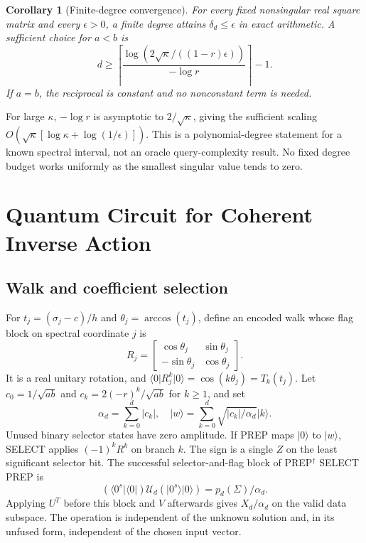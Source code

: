 \documentclass[journal]{IEEEtran}
\newtheorem{corollary}{Corollary}
\newcommand{\ket}[1]{\lvert#1\rangle}
\newcommand{\bra}[1]{\langle#1\rvert}
\begin{document}
\begin{corollary}[Finite-degree convergence]
For every fixed nonsingular real square matrix and every $\epsilon>0$, a
finite degree attains $\delta_d\leq\epsilon$ in exact arithmetic. A sufficient
choice for $a<b$ is
\begin{equation}
 d\geq
 \left\lceil\frac{\log(2\sqrt\kappa/((1-r)\epsilon))}{-\log r}\right\rceil-1.
 \label{eq:degree}
\end{equation}
If $a=b$, the reciprocal is constant and no nonconstant term is needed.
\end{corollary}
For large $\kappa$, $-\log r$ is asymptotic to $2/\sqrt\kappa$, giving the
sufficient scaling $O(\sqrt\kappa[\log\kappa+\log(1/\epsilon)])$. This is a
polynomial-degree statement for a known spectral interval, not an oracle
query-complexity result. No fixed degree budget works uniformly as the
smallest singular value tends to zero.

\section{Quantum Circuit for Coherent Inverse Action}
\label{sec:quantumcircuit}
\subsection{Walk and coefficient selection}
For $t_j=(\sigma_j-c)/h$ and $\theta_j=\arccos(t_j)$, define an encoded walk
whose flag block on spectral coordinate $j$ is
\begin{equation}
 R_j=\begin{bmatrix}
 \cos\theta_j&\sin\theta_j\\-\sin\theta_j&\cos\theta_j
 \end{bmatrix}.
 \label{eq:walk}
\end{equation}
It is a real unitary rotation, and
$\bra0R_j^k\ket0=\cos(k\theta_j)=T_k(t_j)$.
Let $c_0=1/\sqrt{ab}$ and $c_k=2(-r)^k/\sqrt{ab}$ for $k\geq1$, and set
\begin{equation}
 \alpha_d=\sum_{k=0}^d|c_k|,
 \quad \ket w=\sum_{k=0}^d\sqrt{|c_k|/\alpha_d}\ket k.
 \label{eq:lcuweights}
\end{equation}
Unused binary selector states have zero amplitude. If PREP maps $\ket0$ to
$\ket w$, SELECT applies $(-1)^kR^k$ on branch $k$. The sign is a single $Z$
on the least significant selector bit. The successful selector-and-flag block
of PREP$^\dagger$ SELECT PREP is
\begin{equation}
 (\bra{0^s}\bra0)\mathcal U_d(\ket{0^s}\ket0)
 =p_d(\Sigma)/\alpha_d.
 \label{eq:block}
\end{equation}
Applying $U^T$ before this block and $V$ afterwards gives $X_d/\alpha_d$ on
the valid data subspace. The operation is independent of the unknown solution
and, in its unfused form, independent of the chosen input vector.
\end{document}
